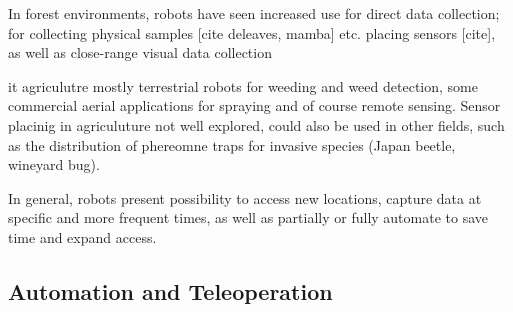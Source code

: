 In forest environments, robots have seen increased use for direct data collection; for collecting physical samples [cite deleaves, mamba] etc. placing sensors [cite], as well as close-range visual data collection

it agriculutre mostly terrestrial robots for weeding and weed detection, some commercial aerial applications for spraying and of course remote sensing. Sensor placinig in agriculuture not well explored, could also be used in other fields, such as the distribution of phereomne traps for invasive species (Japan beetle, wineyard bug). 

In general, robots present possibility to access new locations, capture data at specific and more frequent times, as well as partially or fully automate to save time and expand access.




\subsection{Automation and Teleoperation}

